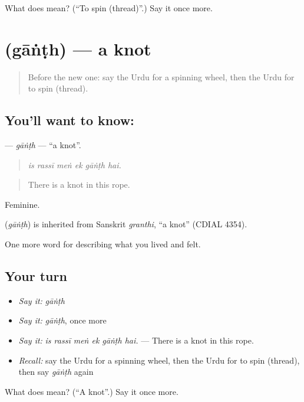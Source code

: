 \begin{tcolorbox}[breakable,colback=teal!4,colframe=teal!35!black,title={Before you move on}]
What does  mean? (\textquotedblleft{}To spin (thread)\textquotedblright{}.) Say it once more.
\end{tcolorbox}
\section[\texorpdfstring{\ur{گانٹھ} (gāṅṭh)}{گانٹھ (gāṅṭh)}]{ (gāṅṭh) — a knot}

\label{lesson:UR-C499-ganth}



\begin{quote}
Before the new one: say the Urdu for a spinning wheel, then the Urdu for to spin (thread).
\end{quote}

\subsection*{You'll want to know: }
\textbf{} — \emph{gāṅṭh} — \textquotedblleft{}a knot\textquotedblright{}.

\begin{quote}
     
\end{quote}

\begin{quote}
\emph{is rassī meṅ ek gāṅṭh hai.}
\end{quote}

\begin{quote}
There is a knot in this rope.
\end{quote}

Feminine.

\begin{cousinweb}
\textbf{} (\emph{gāṅṭh}) is inherited from Sanskrit \emph{granthi}, \textquotedblleft{}a knot\textquotedblright{} (CDIAL 4354).
\end{cousinweb}

\begin{grammarlens}[title={What you've built}]
One more word for describing what you lived and felt.
\end{grammarlens}

\subsection*{Your turn}
\begin{itemize}
\raggedright
  \item \emph{Say it:} \emph{gāṅṭh}
  \item \emph{Say it:} \emph{gāṅṭh}, once more
  \item \emph{Say it:} \emph{is rassī meṅ ek gāṅṭh hai.} — There is a knot in this rope.
  \item \emph{Recall:} say the Urdu for a spinning wheel, then the Urdu for to spin (thread), then say \emph{gāṅṭh} again
\end{itemize}

\begin{tcolorbox}[breakable,colback=teal!4,colframe=teal!35!black,title={Before you move on}]
What does  mean? (\textquotedblleft{}A knot\textquotedblright{}.) Say it once more.
\end{tcolorbox}
